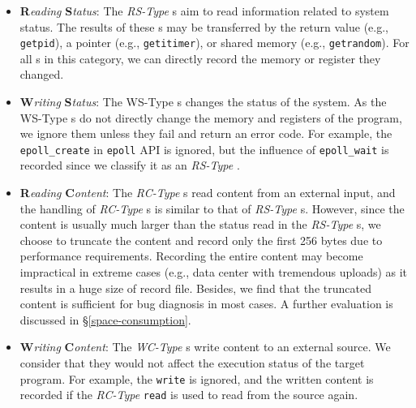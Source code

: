 \begin{itemize}
\item
\noindent\textbf{R}\textit{eading} \textbf{S}\textit{tatus}: 
The \textit{RS-Type} \syscall{}s
aim to read information related to system status. The results of
these \syscall{}s may be transferred by the return value (e.g., \texttt{getpid}), 
a pointer (e.g., \texttt{getitimer}), or shared memory (e.g.,
\texttt{getrandom}). For all \syscall{}s
in this category, we can directly record the memory or register they changed.

\item
\noindent\textbf{W}\textit{riting} \textbf{S}\textit{tatus}: 
The WS-Type \syscall{}s
changes the status of the system. As the WS-Type \syscall{}s do not
directly change the memory and registers of the program, we ignore
them unless they fail and return an error code. 
For example, the \syscall{} \texttt{epoll\_create} in \texttt{epoll} API
is ignored, but the influence of \syscall{} \texttt{epoll\_wait} is
recorded since we classify it as an \textit{RS-Type} \syscall{}.


\item
\noindent\textbf{R}\textit{eading} \textbf{C}\textit{ontent}: 
The \textit{RC-Type} \syscall{}s read content from an external input, and the
handling of \textit{RC-Type} \syscall{}s is similar to that of \textit{RS-Type} 
\syscall{}s. However, since the content is usually much larger than
the status read in the \textit{RS-Type} \syscall{}s, we choose to
truncate the content and record only the first 256 bytes due to
performance requirements. Recording the entire content may become
impractical in extreme cases (e.g., data center with tremendous
uploads) as it results in a huge size of record file. 
Besides, we find that the truncated content is sufficient for bug diagnosis in
most cases. A further evaluation is discussed in
\S \ref{space-consumption}.

\item
\noindent\textbf{W}\textit{riting} \textbf{C}\textit{ontent}:
The \textit{WC-Type} \syscall{}s write content to an external source. We 
consider that they would not affect the execution status of the target
program. For example, the \syscall{} \texttt{write} is ignored, and
the written content is recorded if the \textit{RC-Type} \syscall{}
\texttt{read} is used to read from the source again.
\end{itemize}



